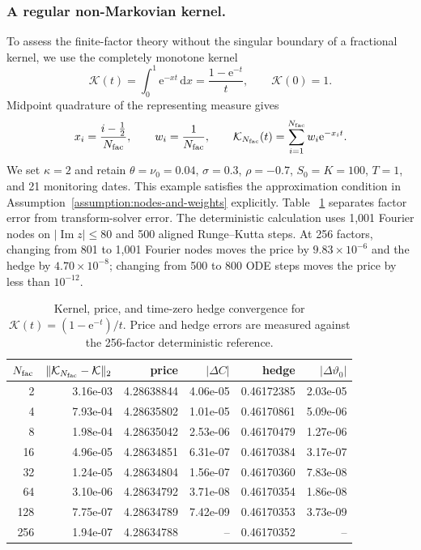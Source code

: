 \documentclass[10pt,a4paper,reqno]{amsart}
\theoremstyle{plain}
\theoremstyle{definition}
\theoremstyle{remark}
\theoremstyle{example}
\begin{document}
 \subsubsection*{A regular non-Markovian kernel.}
To assess the finite-factor theory without the singular boundary of a fractional kernel, we use
the completely monotone kernel
\[
 \mathcal K(t)= \int_0^1\mathrm e^{-xt}\,\mathrm dx = \frac{1-\mathrm e^{-t}}{t},\qquad \mathcal K(0)=1.
\]
Midpoint quadrature of the representing measure gives
\[
 x_i=\frac{i-\frac{1}2}{N_{\rm fac}},\qquad
 w_i=\frac{1}{N_{\rm fac}},\qquad
 \mathcal K_{N_{\rm fac}}(t)=\sum_{i=1}^{N_{\rm fac}}w_i\mathrm e^{-x_it}.
\]
We set \(\kappa=2\) and retain
\(\theta=\nu_0=0.04\), \(\sigma=0.3\), \(\rho=-0.7\),
\(S_0=K=100\), \(T=1\), and 21 monitoring dates.  This example satisfies the approximation
condition in Assumption~\ref{assumption:nodes-and-weights} explicitly.  Table~ \ref{tab:regular-kernel-deterministic}
separates factor error from transform-solver error.  The deterministic calculation uses 1,001
Fourier nodes on \(|\operatorname{Im}z|\leq80\) and 500 aligned Runge--Kutta steps.  At 256
factors, changing from 801 to 1,001 Fourier nodes moves the  price by \(9.83\times10^{-6}\) and the
hedge by \(4.70\times10^{-8}\); changing from 500 to 800 ODE steps moves the price by less than
\(10^{-12}\).

\begin{table}[htbp]
\centering
 \scriptsize
\begin{tabular}{rrrrrr}
\toprule
 \(N_{\rm fac}\) &  \(\|\mathcal K_{N_{\rm fac}}-\mathcal K\|_2\) &  price &  \(|\Delta C|\) & hedge & \(|\Delta\vartheta_0|\) \\
\midrule
2 & 3.16e-03 & 4.28638844 & 4.06e-05 & 0.46172385 & 2.03e-05 \\
4 & 7.93e-04 & 4.28635802 & 1.01e-05 & 0.46170861 & 5.09e-06 \\
8 & 1.98e-04 & 4.28635042 & 2.53e-06 & 0.46170479 & 1.27e-06 \\
16 & 4.96e-05 & 4.28634851 & 6.31e-07 & 0.46170384 & 3.17e-07 \\
32 & 1.24e-05 & 4.28634804 & 1.56e-07 & 0.46170360 & 7.83e-08 \\
64 & 3.10e-06 & 4.28634792 & 3.71e-08 & 0.46170354 & 1.86e-08 \\
128 & 7.75e-07 & 4.28634789 & 7.42e-09 & 0.46170353 & 3.73e-09 \\
256 & 1.94e-07 & 4.28634788 & -- & 0.46170352 & -- \\
\bottomrule
\end{tabular}
 \caption{Kernel, price, and time-zero hedge convergence for
\(\mathcal K(t)=(1-\mathrm e^{-t})/t\).  Price and hedge errors are measured against the
256-factor deterministic reference.}
\label{tab:regular-kernel-deterministic}
\end{table}
\end{document}
